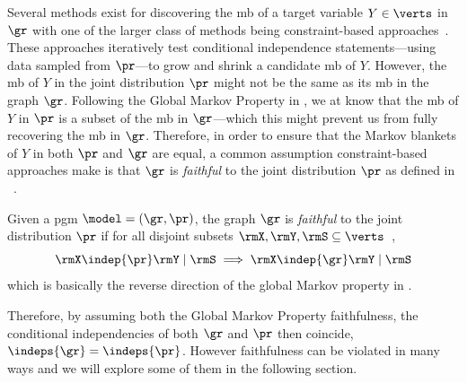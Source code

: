 \documentclass[accepted]{uai2026} %
\theoremstyle{plain}
\theoremstyle{definition}
\theoremstyle{remark}
\begin{document}

Several methods exist for discovering the \acrfull{mb} of a target
variable $Y\in\verts$ in $\gr$ with one of the larger class of methods
being constraint-based approaches~\citep{
  margaritis1999,tsamardinos2003,schluter2014,ling2019}. These
approaches iteratively test conditional independence statements---using
data sampled from $\pr$---to grow and shrink a candidate
\gls{mb} of $Y$. However, the \gls{mb} of $Y$ in
the joint distribution $\pr$ might not be the same as its \gls{mb}
in the graph $\gr$. Following the Global Markov Property in
, we at know that the \gls{mb} of
$Y$ in $\pr$ is a subset of the \gls{mb} in $\gr$---which this
might prevent us from fully recovering the \gls{mb} in
$\gr$. Therefore, in order to ensure that the Markov blankets of $Y$ in
both $\pr$ and $\gr$ are equal, a common assumption constraint-based
approaches make is that $\gr$ is \emph{faithful} to the joint
distribution $\pr$ as defined in ~\citep{spirtes2001}.

\begin{definition}[Faithfulness]\label{def:faith}
  Given a \gls{pgm} $\model=(\gr, \pr)$, the graph
  $\gr$ is \emph{faithful} to the joint distribution $\pr$ if for all
  disjoint subsets $\rmX,\rmY,\rmS\subseteq\verts$~\citep{spirtes2001},
  \begin{equation}
    \label{eq:16}
    \rmX \indep{\pr} \rmY \mid \rmS
    \implies \rmX \indep{\gr} \rmY \mid \rmS
  \end{equation}
  which is basically the reverse direction of the global Markov property
  in .
\end{definition}

Therefore, by assuming both the Global Markov Property faithfulness, the
conditional independencies of both $\gr$ and $\pr$ then coincide,
$\indeps{\gr}=\indeps{\pr}$. However faithfulness can be violated in
many ways and we will explore some of them in the following section.


\end{document}
